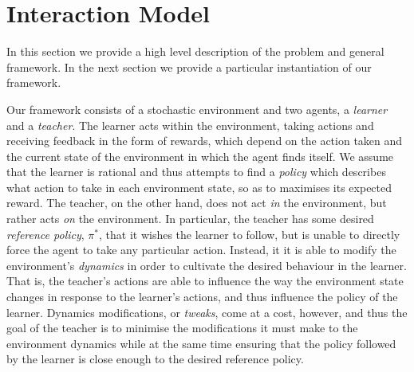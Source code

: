 

\section{Interaction Model}\label{sec: GeneralModel}

In this section we provide a high level description of the problem and
general framework.  In the next section we provide a particular
instantiation of our framework.

Our framework consists of a stochastic environment and two agents, a
\emph{learner} and a \emph{teacher}.  The learner acts within the
environment, taking actions and receiving feedback in the form of
rewards, which depend on the action taken and the current state of the
environment in which the agent finds itself.  We assume that the
learner is rational and thus attempts to find a \emph{policy} which
describes what action to take in each environment state, so as to
maximises its expected reward.  The teacher, on the other hand, does
not act \emph{in} the environment, but rather acts \emph{on} the
environment.  In particular, the teacher has some desired
\emph{reference policy}, $\pi^*$, that it wishes the learner to
follow, but is unable to directly force the agent to take any
particular action.  Instead, it it is able to modify the environment's
\emph{dynamics} in order to cultivate the desired behaviour in the
learner.  That is, the teacher's actions are able to influence the way
the environment state changes in response to the learner's actions,
and thus influence the policy of the learner. Dynamics modifications,
or \emph{tweaks}, come at a cost, however, and thus the goal of the
teacher is to minimise the modifications it must make to the
environment dynamics while at the same time ensuring that the policy
followed by the learner is close enough to the desired reference
policy.

